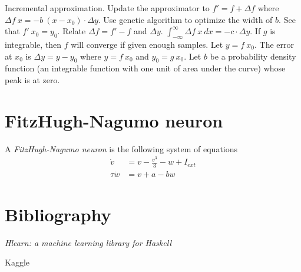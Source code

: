 Incremental approximation.
Update the approximator to \(f' = f + \Delta f\)
where
\(\Delta f~x = - b ~ (x - x_0) \cdot \Delta y\).
Use genetic algorithm to optimize the width of \(b\).
See that \(f'~x_0 = y_0\).
Relate \(\Delta f = f' - f\) and \(\Delta y\).
\(\int_{-\infty}^\infty \Delta f~x ~ dx = - c \cdot \Delta y\).
If \(g\) is integrable, then \(f\) will converge if given enough samples.
Let \(y = f~x_0\).
The error at \(x_0\) is \(\Delta y = y - y_0\)
where \(y = f~x_0\) and \(y_0 = g~x_0\).
Let \(b\) be a probability density function (an integrable function with one unit of area under the curve) whose peak is at zero.



\section{FitzHugh-Nagumo neuron}

%
%
A \emph{FitzHugh-Nagumo neuron} is the following system of equations \cite{izhikevich2006fhn}
\begin{align*}
    \dot v &= v - \frac{v^3}{3} - w + I_{ext}
    \\
    \tau \dot w &= v + a - b w
\end{align*}

\section{Bibliography}

\emph{Hlearn: a machine learning library for Haskell} \cite{izbicki2013hlearn}

Kaggle
